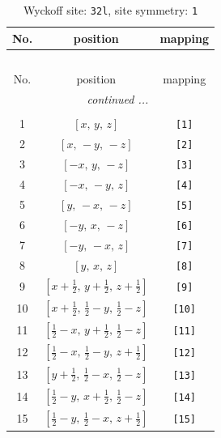 \documentclass[fleqn,8pt]{jsarticle}
\begin{document}
\renewcommand{\arraystretch}{1.2}
\begin{longtable}{ccc}
\caption{Wyckoff site: {\tt 32l}, site symmetry: {\tt 1}}
 \\
 \hline \hline
No. & position & mapping \\ \hline \endfirsthead

\multicolumn{2}{l}{\tablename\ \thetable{}} \\
 \hline \hline
No. & position & mapping \\ \hline \endhead

 \hline \hline
\multicolumn{2}{r}{\footnotesize\it continued ...} \\ \endfoot

 \hline \hline
\multicolumn{2}{r}{} \\ \endlastfoot

1 & $\left[ x,\, y,\, z \right]$ & {\tt [1]} \\ \hline
2 & $\left[ x,\, - y,\, - z \right]$ & {\tt [2]} \\ \hline
3 & $\left[ - x,\, y,\, - z \right]$ & {\tt [3]} \\ \hline
4 & $\left[ - x,\, - y,\, z \right]$ & {\tt [4]} \\ \hline
5 & $\left[ y,\, - x,\, - z \right]$ & {\tt [5]} \\ \hline
6 & $\left[ - y,\, x,\, - z \right]$ & {\tt [6]} \\ \hline
7 & $\left[ - y,\, - x,\, z \right]$ & {\tt [7]} \\ \hline
8 & $\left[ y,\, x,\, z \right]$ & {\tt [8]} \\ \hline
9 & $\left[ x + \frac{1}{2},\, y + \frac{1}{2},\, z + \frac{1}{2} \right]$ & {\tt [9]} \\ \hline
10 & $\left[ x + \frac{1}{2},\, \frac{1}{2} - y,\, \frac{1}{2} - z \right]$ & {\tt [10]} \\ \hline
11 & $\left[ \frac{1}{2} - x,\, y + \frac{1}{2},\, \frac{1}{2} - z \right]$ & {\tt [11]} \\ \hline
12 & $\left[ \frac{1}{2} - x,\, \frac{1}{2} - y,\, z + \frac{1}{2} \right]$ & {\tt [12]} \\ \hline
13 & $\left[ y + \frac{1}{2},\, \frac{1}{2} - x,\, \frac{1}{2} - z \right]$ & {\tt [13]} \\ \hline
14 & $\left[ \frac{1}{2} - y,\, x + \frac{1}{2},\, \frac{1}{2} - z \right]$ & {\tt [14]} \\ \hline
15 & $\left[ \frac{1}{2} - y,\, \frac{1}{2} - x,\, z + \frac{1}{2} \right]$ & {\tt [15]} \\ \hline

\end{longtable}
\end{document}
